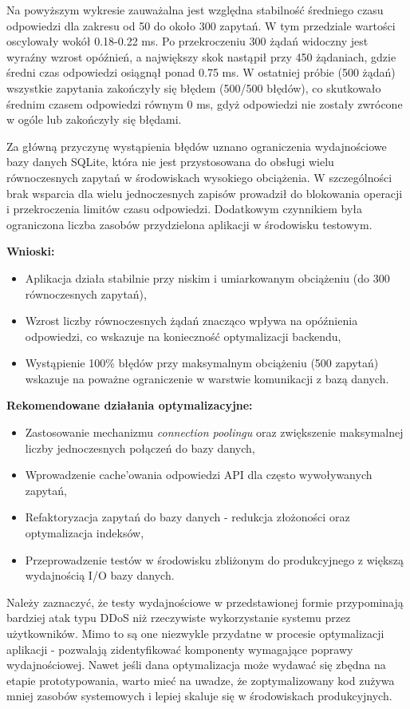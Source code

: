 Na powyższym wykresie zauważalna jest względna stabilność średniego czasu odpowiedzi dla zakresu od 50 do około 300 zapytań. W tym przedziale wartości oscylowały wokół 0.18-0.22 ms. Po przekroczeniu 300 żądań widoczny jest wyraźny wzrost opóźnień, a największy skok nastąpił przy 450 żądaniach, gdzie średni czas odpowiedzi osiągnął ponad 0.75 ms. W ostatniej próbie (500 żądań) wszystkie zapytania zakończyły się błędem (500/500 błędów), co skutkowało średnim czasem odpowiedzi równym 0 ms, gdyż odpowiedzi nie zostały zwrócone w ogóle lub zakończyły się błędami.

Za główną przyczynę wystąpienia błędów uznano ograniczenia wydajnościowe bazy danych SQLite, która nie jest przystosowana do obsługi wielu równoczesnych zapytań w środowiskach wysokiego obciążenia. W szczególności brak wsparcia dla wielu jednoczesnych zapisów prowadził do blokowania operacji i przekroczenia limitów czasu odpowiedzi. Dodatkowym czynnikiem była ograniczona liczba zasobów przydzielona aplikacji w środowisku testowym.

\textbf{Wnioski:}
\begin{itemize}
    \item Aplikacja działa stabilnie przy niskim i umiarkowanym obciążeniu (do 300 równoczesnych zapytań),
    \item Wzrost liczby równoczesnych żądań znacząco wpływa na opóźnienia odpowiedzi, co wskazuje na konieczność optymalizacji backendu,
    \item Wystąpienie 100\% błędów przy maksymalnym obciążeniu (500 zapytań) wskazuje na poważne ograniczenie w warstwie komunikacji z bazą danych.
\end{itemize}

\textbf{Rekomendowane działania optymalizacyjne:}
\begin{itemize}
    \item Zastosowanie mechanizmu \textit{connection poolingu} oraz zwiększenie maksymalnej liczby jednoczesnych połączeń do bazy danych,
    \item Wprowadzenie cache'owania odpowiedzi API dla często wywoływanych zapytań,
    \item Refaktoryzacja zapytań do bazy danych - redukcja złożoności oraz optymalizacja indeksów,
    \item Przeprowadzenie testów w środowisku zbliżonym do produkcyjnego z większą wydajnością I/O bazy danych.
\end{itemize}

\noindent
Należy zaznaczyć, że testy wydajnościowe w przedstawionej formie przypominają bardziej atak typu DDoS niż rzeczywiste wykorzystanie systemu przez użytkowników. Mimo to są one niezwykle przydatne w procesie optymalizacji aplikacji - pozwalają zidentyfikować komponenty wymagające poprawy wydajnościowej. Nawet jeśli dana optymalizacja może wydawać się zbędna na etapie prototypowania, warto mieć na uwadze, że zoptymalizowany kod zużywa mniej zasobów systemowych i lepiej skaluje się w środowiskach produkcyjnych.

